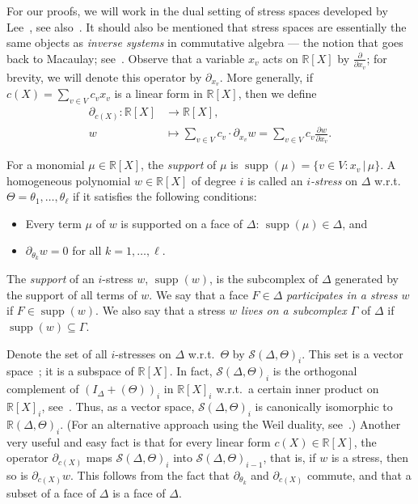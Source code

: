 \documentclass[ALCO,ThmDefs,Unicode,epreuves]{cedram}
\DeclareMathOperator{\supp}{supp}
\newcommand{\R}{\mathbb{R}{}}
\newcommand{\Stress}{\mathcal{S}}
\begin{document}
For our proofs, we will work in the dual setting of stress spaces developed by Lee~\cite{Lee96}, see also~\cite[Section 3]{Adiprasito-g-conj}. It should also be mentioned that stress spaces are essentially the same objects as \emph{inverse systems} in commutative algebra --- the notion that goes back to Macaulay; see~\cite[Theorem 21.6 and Exercise 21.7]{Eisenbud}. Observe that a variable $x_v$ acts on $\R[X]$ by $\frac{\partial}{\partial{x_v}}$; for brevity, we will denote this operator by $\partial_{x_v}$. More generally, if $c(X)=\sum_{v\in V} c_v x_v$ is a linear form in $\R[X]$, then we define \begin{equation*}
\begin{split}
\partial_{c(X)} : \R[X]&\to\R[X], \\
w&\mapsto \sum_{v\in V}c_v\cdot\partial_{x_v}w=\sum_{v\in V}c_v\frac{\partial w}{\partial{x_v}}.
\end{split}
\end{equation*}
	
For a monomial $\mu\in \R[X]$, the \emph{support} of $\mu$ is $\supp(\mu)=\{v\in V : x_v\,|\,\mu\}$. A homogeneous polynomial $w\in\R[X]$ of degree $i$ is called an \emph{$i$-stress} on $\Delta$ w.r.t.~$\Theta=\theta_1,\ldots,\theta_\ell$ if it satisfies the following conditions:
	\begin{itemize}
	\item Every term $\mu$ of $w$ is supported on a face of $\Delta$: $\supp(\mu)\in\Delta$, and
	\item $\partial_{\theta_k}w=0$ for all $k=1,\ldots,\ell$.
	\end{itemize}
The \emph{support} of an $i$-stress $w$, $\supp (w)$, is the subcomplex of $\Delta$ generated by the support of all terms of $w$. We say that a face $F\in\Delta$ \emph{participates in a stress $w$} if $F\in \supp(w)$. We also say that a stress $w$ \emph{lives on a subcomplex $\Gamma$} of $\Delta$ if $\supp(w)\subseteq \Gamma$.

Denote the set of all $i$-stresses on $\Delta$ w.r.t.~$\Theta$ by $\Stress(\Delta, \Theta)_i$. 
This set is a vector space~\cite{Adiprasito-g-conj,Lee96}; it is a subspace of $\R[X]$. In fact, $\Stress(\Delta, \Theta)_i$ is the orthogonal complement of $(I_\Delta+(\Theta))_i$ in $\R[X]_i$ w.r.t.~a certain inner product on $\R[X]_i$, see~\cite[Section 3]{Lee96}. Thus, as a vector space, $\Stress(\Delta, \Theta)_i$ is canonically isomorphic to $\R(\Delta, \Theta)_i$. (For an alternative approach using the Weil duality, see~\cite[Section 3]{Adiprasito-g-conj}.) Another very useful and easy fact is that for every linear form $c(X)\in \R[X]$, the operator $\partial_{c(X)}$ maps $\Stress(\Delta,\Theta)_i$ into $\Stress(\Delta, \Theta)_{i-1}$, that is, if $w$ is a stress, then so is $\partial_{c(X)}w$. This follows from the fact that $\partial_{\theta_k}$ and $\partial_{c(X)}$ commute, and that a subset of a face of $\Delta$ is a face of $\Delta$.
\end{document}
